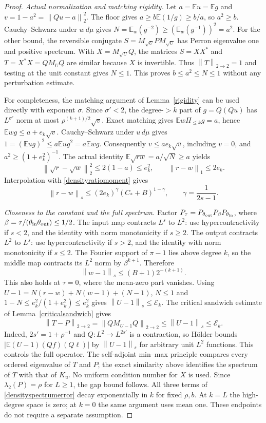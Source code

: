 \documentclass[11pt]{article}
\newcommand{\E}{\mathbb E}
\newcommand{\norm}[1]{\left\|#1\right\|}
\begin{document}
\begin{proof}
\emph{Actual normalization and matching rigidity.}
Let $a=\E u=\E g$ and $v=1-a^2=\norm{Qu-a}_2^2$.
The floor gives $a\geq b\E(1/g)\geq b/a$, so $a^2\geq b$.
Cauchy--Schwarz under $w\,d\mu$ gives
$N=\E_w(g^{-2})\geq(\E_w(g^{-1}))^2=a^2$.
For the other bound, the reversible conjugate
$S=M_{\sqrt U}PM_{\sqrt U}$ has Perron eigenvalue one and positive
spectrum. With $X=M_{\sqrt U}Q$, the matrices $S=XX^*$ and
$T=X^*X=QM_UQ$ are similar because $X$ is invertible. Thus
$\norm T_{2\to2}=1$ and testing at the unit constant gives $N\leq1$.
This proves $b\leq a^2\leq N\leq1$ without any perturbation estimate.

For completeness, the matching argument of Lemma~\ref{rigidity} can
be used directly with exponent $\sigma$. Since $\sigma'<2$, the
degree-$>k$ part of $g=Q(Qu)$ has $L^{\sigma'}$ norm at most
$\rho^{(k+1)/2}\sqrt v$. Exact matching gives
$\E w\Pi_{\leq k}g=a$, hence
$\E wg\leq a+e_k\sqrt v$.
Cauchy--Schwarz under $u\,d\mu$ gives
$1=(\E ug)^2\leq a\E ug^2=a\E wg$.
Consequently $v\leq ae_k\sqrt v$, including $v=0$, and
$a^2\geq(1+e_k^2)^{-1}$.
The actual identity $\E\sqrt{rw}=a/\sqrt N\geq a$ yields
\[
 \norm{\sqrt r-\sqrt w}_2^2
       \leq2(1-a)\leq e_k^2,\qquad \norm{r-w}_1\leq2e_k.
\]
Interpolation with \eqref{densityratiomoment} gives
\begin{equation}\label{densitycriticalcloseness}
 \norm{r-w}_s\leq(2e_k)^\gamma(C_*+B)^{1-\gamma},
 \qquad \gamma=\frac1{2s-1}.
\end{equation}

\emph{Closeness to the constant and the full spectrum.}
Factor $P_\tau=P_{\theta_{\rm out}}P_\beta P_{\theta_{\rm in}}$,
where $\beta=\tau/(\theta_{\rm in}\theta_{\rm out})\leq1/2$.
The input map contracts $L^s$ to $L^2$: use hypercontractivity if
$s<2$, and the identity with norm monotonicity if $s\geq2$.
The output contracts $L^2$ to $L^s$: use hypercontractivity if $s>2$,
and the identity with norm monotonicity if $s\leq2$.
The Fourier support of $\pi-1$ lies above degree $k$, so the middle
map contracts its $L^2$ norm by $\beta^{k+1}$. Therefore
\[
 \norm{w-1}_s\leq(B+1)2^{-(k+1)}.
\]
This also holds at $\tau=0$, where the mean-zero part vanishes.
Using $U-1=N(r-w)+N(w-1)+(N-1)$, $N\leq1$ and
$1-N\leq e_k^2/(1+e_k^2)\leq e_k^2$ gives
$\norm{U-1}_s\leq\mathcal E_k$.
The critical sandwich estimate of Lemma~\ref{criticalsandwich} gives
\[
 \norm{T-P}_{2\to2}=\norm{QM_{U-1}Q}_{2\to2}
              \leq\norm{U-1}_s\leq\mathcal E_k.
\]
Indeed, $2s'=1+\rho^{-1}$ and $Q:L^2\to L^{2s'}$ is a contraction,
so H\"older bounds $|\E(U-1)(Qf)(Q\ell)|$ by $\norm{U-1}_s$ for
arbitrary unit $L^2$ functions. This controls the full operator.
The self-adjoint min--max principle compares every ordered eigenvalue
of $T$ and $P$; the exact similarity above identifies the spectrum of
$T$ with that of $K_u$. No uniform condition number for $X$ is used.
Since $\lambda_2(P)=\rho$ for $L\geq1$, the gap bound follows.
All three terms of \eqref{densityspectrumerror} decay exponentially in
$k$ for fixed $\rho,b$. At $k=L$ the high-degree space is zero; at
$k=0$ the same argument uses mean one. These endpoints do not require
a separate assumption.
\end{proof}
\end{document}
